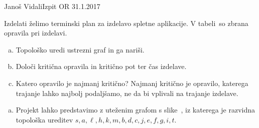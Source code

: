 \begin{naloga}{Janoš Vidali}{Izpit OR 31.1.2017}
\begin{vprasanje}
Izdelati želimo terminski plan za izdelavo spletne aplikacije.
V tabeli~\tab so zbrana opravila pri izdelavi.

\begin{enumerate}[(a)]
\item Topološko uredi ustrezni graf in ga nariši.
\item Določi kritična opravila in kritično pot ter čas izdelave.
\item Katero opravilo je najmanj kritično?
Najmanj kritično je opravilo, katerega trajanje lahko najbolj podaljšamo,
ne da bi vplivali na trajanje izdelave.
\end{enumerate}

\begin{tabela}
\end{tabela}
\end{vprasanje}

\begin{odgovor}
\begin{enumerate}[(a)]
\item Projekt lahko predstavimo z uteženim grafom s slike~\fig,
iz katerega je raz\-vid\-na topološka ureditev
$s, a, \ell, h, k, m, b, d, c, j, e, f, g, i, t$.


\end{enumerate}
\end{odgovor}
\end{naloga}

